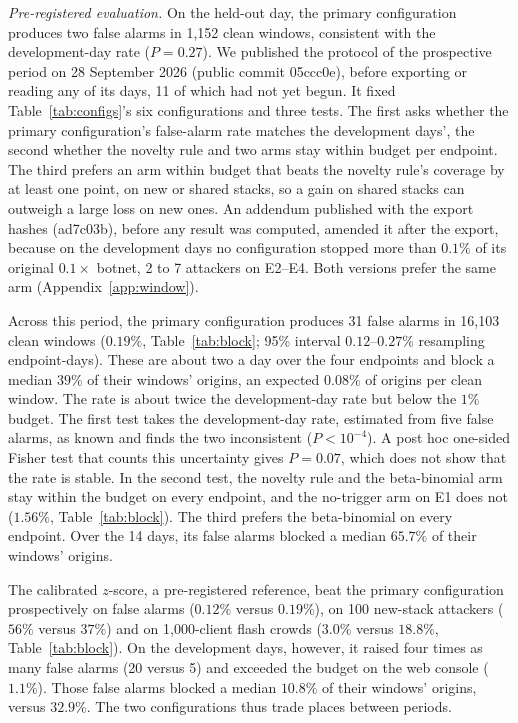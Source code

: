 \documentclass[conference,letterpaper,10pt]{IEEEtran}
\newcommand\1{\textit{(i)}}
\newcommand\2{\textit{(ii)}}
\newcommand\3{\textit{(iii)}}
\newcommand\4{\textit{(iv)}}
\newcommand\5{\textit{(v)}}
\newcommand\6{\textit{(vi)}}
\newcommand\7{\textit{(vii)}}
\newcommand\8{\textit{(viii)}}
\newcommand\9{\textit{(ix)}}
\begin{document}
\textit{Pre-registered evaluation.} On the held-out day, the primary configuration produces two false alarms in 1,152 clean windows, consistent with the development-day rate ($P = 0.27$).  We published the protocol of the prospective period on 28 September 2026 (public commit 05ccc0e), before exporting or reading any of its days, 11 of which had not yet begun. It fixed Table~\ref{tab:configs}'s six configurations and three tests.  The first asks whether the primary configuration's false-alarm rate matches the development days', the second whether the novelty rule and two arms stay within budget per endpoint. The third prefers an arm within budget that beats the novelty rule's coverage by at least one point, on new or shared stacks, so a gain on shared stacks can outweigh a large loss on new ones. An addendum published with the export hashes (ad7c03b), before any result was computed, amended it after the export, because on the development days no configuration stopped more than $0.1\%$ of its original $0.1\times$ botnet, 2 to 7 attackers on E2--E4. Both versions prefer the same arm (Appendix~\ref{app:window}).

Across this period, the primary configuration produces 31 false alarms in 16,103 clean windows ($0.19\%$, Table~\ref{tab:block}; 95\% interval $0.12$--$0.27\%$ resampling endpoint-days). These are about two a day over the four endpoints and block a median $39\%$ of their windows' origins, an expected $0.08\%$ of origins per clean window.   The rate is about twice the development-day rate but below the $1\%$ budget. The first test takes the development-day rate, estimated from five false alarms, as known and finds the two inconsistent ($P < 10^{-4}$). A post hoc one-sided Fisher test that counts this uncertainty gives $P = 0.07$, which does not show that the rate is stable. In the second test, the novelty rule and the beta-binomial arm stay within the budget on every endpoint, and the no-trigger arm on E1 does not ($1.56\%$, Table~\ref{tab:block}). The third prefers the beta-binomial on every endpoint. Over the 14 days, its false alarms blocked a median $65.7\%$ of their windows' origins.

The calibrated $z$-score, a pre-registered reference, beat the primary configuration prospectively on false alarms ($0.12\%$ versus $0.19\%$), on 100 new-stack attackers ($56\%$ versus $37\%$) and on 1,000-client flash crowds ($3.0\%$ versus $18.8\%$, Table~\ref{tab:block}). On the development days, however, it raised four times as many false alarms (20 versus 5) and exceeded the budget on the web console ($1.1\%$). Those false alarms blocked a median $10.8\%$ of their windows' origins, versus $32.9\%$. The two configurations thus trade places between periods.
\end{document}
